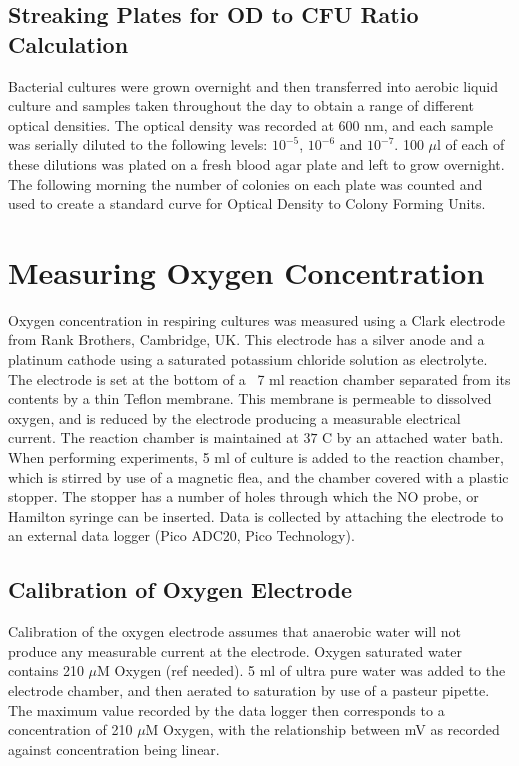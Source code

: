 \subsection{Streaking Plates for OD to CFU Ratio Calculation}
Bacterial cultures were grown overnight and then transferred into aerobic liquid culture and samples taken throughout the day to obtain a range of different optical densities. The optical density was recorded at 600 nm, and each sample was serially diluted to the following levels: $10^{-5}$, $10^{-6}$ and $10^{-7}$. 100 $\mu$l of each of these dilutions was plated on a fresh blood agar plate and left to grow overnight. The following morning the number of colonies on each plate was counted and used to create a standard curve for Optical Density to Colony Forming Units.

\section{Measuring Oxygen Concentration}
Oxygen concentration in respiring cultures was measured using a Clark electrode \cite{Clark1953} from Rank Brothers, Cambridge, UK. This electrode has a silver anode and a platinum cathode using a saturated potassium chloride solution as electrolyte. The electrode is set at the bottom of a ~7 ml reaction chamber separated from its contents by a thin Teflon membrane. This membrane is permeable to dissolved oxygen, and is reduced by the electrode producing a measurable electrical current. The reaction chamber is maintained at $37$ \textdegree C by an attached water bath.
When performing experiments, 5 ml of culture is added to the reaction chamber, which is stirred by use of a magnetic flea, and the chamber covered with a plastic stopper. The stopper has a number of holes through which the NO probe, or Hamilton syringe can be inserted. Data is collected by attaching the electrode to an external data logger (Pico ADC20, Pico Technology).

\subsection{Calibration of Oxygen Electrode}
Calibration of the oxygen electrode assumes that anaerobic water will not produce any measurable current at the electrode. Oxygen saturated water contains 210 $\mu$M Oxygen (ref needed). 5 ml of ultra pure water was added to the electrode chamber, and then aerated to saturation by use of a pasteur pipette. The maximum value recorded by the data logger then corresponds to a concentration of 210 $\mu$M Oxygen, with the relationship between mV as recorded against concentration being linear.

